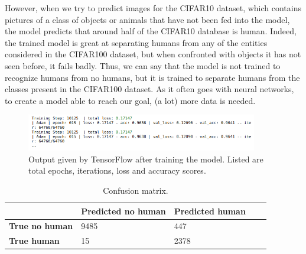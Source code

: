 However, when we try to predict images for the CIFAR10 dataset, which contains pictures of a class of objects or animals that have not been fed into the model, the model predicts that around half of the CIFAR10 database is human. Indeed, the trained model is great at separating humans from any of the entities considered in the CIFAR100 dataset, but when confronted with objects it has not seen before, it fails badly. Thus, we can say that the model is not trained to recognize humans from no humans, but it is trained to separate humans from the classes present in the CIFAR100 dataset. As it often goes with neural networks, to create a model able to reach our goal, (a lot) more data is needed.

\begin{figure}[h!]
	\centering
	\includegraphics[width=0.9\textwidth]{../figures/result.png}
	\caption{Output given by TensorFlow after training the model. Listed are total epochs, iterations, loss and accuracy scores.
		\label{fig:results}}
\end{figure}
\begin{table}[h]
	\centering
	\caption{Confusion matrix. \label{tab:conf}}
	\begin{tabular}{l|llll}
		& \textbf{Predicted no human} & \textbf{Predicted human} \\ \hline
		\textbf{True no human}         &    9485                        & 447   \\ 
		\textbf{True human}          & 15                         & 2378     \\
	\end{tabular}
\end{table}




